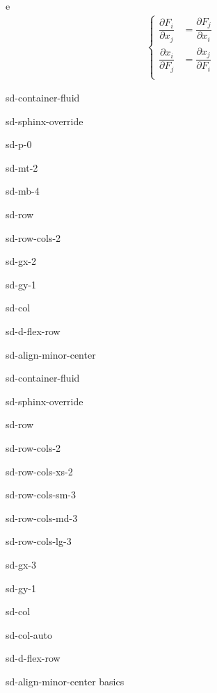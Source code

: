 \documentclass[letterpaper,10pt,english]{jupyterBook}
\begin{document}
\sphinxAtStartPar
e
\begin{equation*}
\begin{split}\begin{cases}
 \dfrac{\partial F_i}{\partial x_j} & =  \dfrac{\partial F_j}{\partial x_i} \\
 \dfrac{\partial x_i}{\partial F_j} & =  \dfrac{\partial x_j}{\partial F_i} \\
\end{cases}\end{split}
\end{equation*}
\sphinxstepscope

\begin{sphinxuseclass}{sd-container-fluid}
\begin{sphinxuseclass}{sd-sphinx-override}
\begin{sphinxuseclass}{sd-p-0}
\begin{sphinxuseclass}{sd-mt-2}
\begin{sphinxuseclass}{sd-mb-4}
\begin{sphinxuseclass}{sd-row}
\begin{sphinxuseclass}{sd-row-cols-2}
\begin{sphinxuseclass}{sd-gx-2}
\begin{sphinxuseclass}{sd-gy-1}
\begin{sphinxuseclass}{sd-col}
\begin{sphinxuseclass}{sd-d-flex-row}
\begin{sphinxuseclass}{sd-align-minor-center}
\begin{sphinxuseclass}{sd-container-fluid}
\begin{sphinxuseclass}{sd-sphinx-override}
\begin{sphinxuseclass}{sd-row}
\begin{sphinxuseclass}{sd-row-cols-2}
\begin{sphinxuseclass}{sd-row-cols-xs-2}
\begin{sphinxuseclass}{sd-row-cols-sm-3}
\begin{sphinxuseclass}{sd-row-cols-md-3}
\begin{sphinxuseclass}{sd-row-cols-lg-3}
\begin{sphinxuseclass}{sd-gx-3}
\begin{sphinxuseclass}{sd-gy-1}
\begin{sphinxuseclass}{sd-col}
\begin{sphinxuseclass}{sd-col-auto}
\begin{sphinxuseclass}{sd-d-flex-row}
\begin{sphinxuseclass}{sd-align-minor-center}
\sphinxAtStartPar
basics


\end{sphinxuseclass}
\end{sphinxuseclass}
\end{sphinxuseclass}
\end{sphinxuseclass}
\end{sphinxuseclass}
\end{sphinxuseclass}
\end{sphinxuseclass}
\end{sphinxuseclass}
\end{sphinxuseclass}
\end{sphinxuseclass}
\end{sphinxuseclass}
\end{sphinxuseclass}
\end{sphinxuseclass}
\end{sphinxuseclass}
\end{sphinxuseclass}
\end{sphinxuseclass}
\end{sphinxuseclass}
\end{sphinxuseclass}
\end{sphinxuseclass}
\end{sphinxuseclass}
\end{sphinxuseclass}
\end{sphinxuseclass}
\end{sphinxuseclass}
\end{sphinxuseclass}
\end{sphinxuseclass}
\end{sphinxuseclass}
\end{document}
